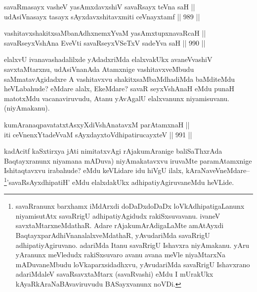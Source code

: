
\begin{shl}
savaRmasayx vasheV yasAmxdavxshiV savaRsayx teVna saH || \\
udAsiVnasayx tasayx sAyxdavxshitavxmiti ceVnayxtamf \hfill || 989 ||  
\end{shl}

\begin{shl}
vashitavxshakitxsaMbanAdhxnemxYvaM yasAmxtupxnavaRcaH || \\
savaRseyxVshAna EveVti savaRseyxVSeTxV sadeYva saH \hfill || 990 ||  
\end{shl}

\begin{artha}
elalxvU ivanavashadalilxde yAdadxriMda elalxvakUkx avaneVvashiV savxtaMtarxnu, udAsiVnanAda Atamxnige vashitavxveMbudu saMmatavAgidadxre A vashitavxvu shakitxsaMbaMdhadiMda baMditeMdu heVLabahude? eMdare alalx, EkeMdare? savaR seyxVshAnaH eMdu punaH matotxMdu vacanaviruvudu, Atanu yAvAgalU elalxvanunx niyamisuvanu. (niyAmakanu).
\end{artha}


\begin{shl}
kumAranaqpavatatxtAsxyXdiVshAnatavxM parAtamxnaH ||  \\
iti ceVnenxYtadeVvaM sAyxdayxtoV\s dhipatirucayxteV \hfill || 991 ||  
\end{shl}

\begin{artha}
kadAcitf kaSxtirxya jAti nimitatxvAgi rAjakumAranige baliSaThxrAda Baqtayxranunx niyamana mADuva) niyAmakatavxvu iruvaMte paramAtamxnige Ishitaqtavxvu irabahude? eMdu keVLidare idu hiVgU ilalx, kAraNaveVneMdare{\rm --}\footnote{savaRranunx barxhamx iMdArxdi doDaDxdoDaDx loVkAdhipatigaLanunx niyamisutAtx savaRrigU adhipatiyAgidudx rakiSxsuvavanu. ivaneV savxtaMtarxneMdathaR. Adare rAjakumArAdigaLaMte amAtAyxdi BaqtayxparAdhiVnanalalxveMdathaR, yAvudariMda savaRrigU adhipatiyAgiruvano. adariMda Itanu savaRrigU Ishavxra niyAmakanu. yAru yAranunx meVledudx rakiSxsuvaro avanu avana meVle niyaMtarxNa mADuvaneMbudu loVkaparxsidadhxvu, yAvudariMda savaRrigU Ishavxrano adariMdaleV savaRsavxtaMtarx (savaRvashi) eMdu I mUrakUkx kAyaRkAraNaBAvaviruvudu BASayxvanunx noVDi.}'savaRsAyxdhipatiH' eMdu elalxdakUkx adhipatiyAgiruvaneMdu heVLide.
\end{artha}

